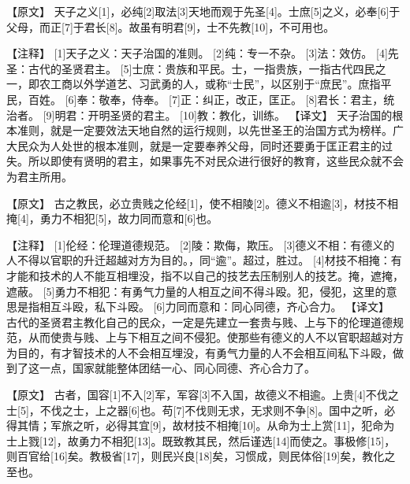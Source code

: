 \documentclass[a4paper,12pt,UTF8,twoside]{ctexbook}
\begin{document}
【原文】
天子之义[1]，必纯[2]取法[3]天地而观于先圣[4]。士庶[5]之义，必奉[6]于父母，而正[7]于君长[8]。故虽有明君[9]，士不先教[10]，不可用也。




【注释】
[1]天子之义：天子治国的准则。
[2]纯：专一不杂。
[3]法：效仿。
[4]先圣：古代的圣贤君主。
[5]士庶：贵族和平民。士，一指贵族，一指古代四民之一，即农工商以外学道艺、习武勇的人，或称“士民”，以区别于“庶民”。庶指平民，百姓。
[6]奉：敬奉，侍奉。
[7]正：纠正，改正，匡正。
[8]君长：君主，统治者。
[9]明君：开明圣贤的君主。
[10]教：教化，训练。
【译文】
天子治国的根本准则，就是一定要效法天地自然的运行规则，以先世圣王的治国方式为榜样。广大民众为人处世的根本准则，就是一定要奉养父母，同时还要勇于匡正君主的过失。所以即使有贤明的君主，如果事先不对民众进行很好的教育，这些民众就不会为君主所用。


【原文】
古之教民，必立贵贱之伦经[1]，使不相陵[2]。德义不相逾[3]，材技不相掩[4]，勇力不相犯[5]，故力同而意和[6]也。




【注释】
[1]伦经：伦理道德规范。
[2]陵：欺侮，欺压。
[3]德义不相：有德义的人不得以官职的升迁超越对方为目的。，同“逾”。超过，胜过。
[4]材技不相掩：有才能和技术的人不能互相埋没，指不以自己的技艺去压制别人的技艺。掩，遮掩，遮蔽。
[5]勇力不相犯：有勇气力量的人相互之间不得斗殴。犯，侵犯，这里的意思是指相互斗殴，私下斗殴。
[6]力同而意和：同心同德，齐心合力。
【译文】
古代的圣贤君主教化自己的民众，一定是先建立一套贵与贱、上与下的伦理道德规范，从而使贵与贱、上与下相互之间不侵犯。使那些有德义的人不以官职超越对方为目的，有才智技术的人不会相互埋没，有勇气力量的人不会相互间私下斗殴，做到了这一点，国家就能整体团结一心、同心同德、齐心合力了。

【原文】
古者，国容[1]不入[2]军，军容[3]不入国，故德义不相逾。上贵[4]不伐之士[5]，不伐之士，上之器[6]也。苟[7]不伐则无求，无求则不争[8]。国中之听，必得其情；军旅之听，必得其宜[9]，故材技不相掩[10]。从命为士上赏[11]，犯命为士上戮[12]，故勇力不相犯[13]。既致教其民，然后谨选[14]而使之。事极修[15]，则百官给[16]矣。教极省[17]，则民兴良[18]矣，习惯成，则民体俗[19]矣，教化之至也。
\end{document}
